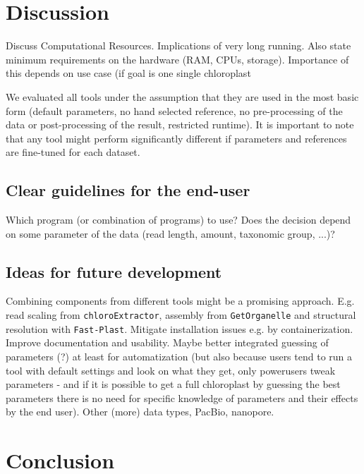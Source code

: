 \documentclass{bmcart}
\newcommand{\formatprogramnames}[1]{\texttt{#1}}
\newcommand{\ce}{\formatprogramnames{chloroExtractor}}
\newcommand{\fp}{\formatprogramnames{Fast-Plast}}
\newcommand{\go}{\formatprogramnames{GetOrganelle}}
\begin{document}
\section*{Discussion}
Discuss Computational Resources. Implications of very long running. Also state minimum requirements on the hardware (RAM, CPUs, storage). Importance of this depends on use case (if goal is one single chloroplast 

We evaluated all tools under the assumption that they are used in the most basic form (default parameters, no hand selected reference, no pre-processing of the data or post-processing of the result, restricted runtime). It is important to note that any tool might perform significantly different if parameters and references are fine-tuned for each dataset.

\subsection*{Clear guidelines for the end-user}
Which program (or combination of programs) to use? Does the decision depend on some parameter of the data (read length, amount, taxonomic group, ...)?

\subsection*{Ideas for future development}
Combining components from different tools might be a promising approach. E.g. read scaling from \ce{}, assembly from \go{} and structural resolution with \fp{}.
Mitigate installation issues e.g. by containerization.
Improve documentation and usability.
Maybe better integrated guessing of parameters (?) at least for automatization (but also because users tend to run a tool with default settings and look on what they get, only powerusers tweak parameters - and if it is possible to get a full chloroplast by guessing the best parameters there is no need for specific knowledge of parameters and their effects by the end user).
Other (more) data types, PacBio, nanopore.

\section*{Conclusion}
\end{document}
